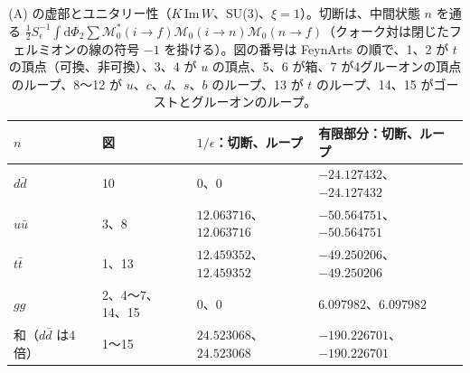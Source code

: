 \documentclass[a4paper,10pt]{ltjsarticle}
\begin{document}
\begin{table}[tbp]
\centering\small
\caption{(A) の虚部とユニタリー性（$K\,\mathrm{Im}\,W$、SU(3)、$\xi=1$）。切断は、中間状態 $n$ を通る $\frac12S_\epsilon^{-1}\int\mathrm d\Phi_2\sum\mathcal M_0^*(i\to f)\mathcal M_0(i\to n)\mathcal M_0(n\to f)$（クォーク対は閉じたフェルミオンの線の符号 $-1$ を掛ける）。図の番号は FeynArts の順で、1、2 が $t$ の頂点（可換、非可換）、3、4 が $u$ の頂点、5、6 が箱、7 が4グルーオンの頂点のループ、8〜12 が $u$、$c$、$d$、$s$、$b$ のループ、13 が $t$ のループ、14、15 がゴーストとグルーオンのループ。}
\label{tab:unit}
\begin{tabular}{llll}
\toprule
$n$ & 図 & $1/\epsilon$：切断、ループ & 有限部分：切断、ループ \\
\midrule
$d\bar d$ & 10 & $0$、$0$ & $-24.127432$、$-24.127432$ \\
$u\bar u$ & 3、8 & $12.063716$、$12.063716$ & $-50.564751$、$-50.564751$ \\
$t\bar t$ & 1、13 & $12.459352$、$12.459352$ & $-49.250206$、$-49.250206$ \\
$gg$ & 2、4〜7、14、15 & $0$、$0$ & $6.097982$、$6.097982$ \\
\midrule
和（$d\bar d$ は4倍） & 1〜15 & $24.523068$、$24.523068$ & $-190.226701$、$-190.226701$ \\
\bottomrule
\end{tabular}
\end{table}
\end{document}
